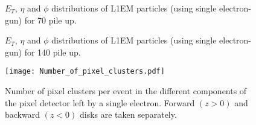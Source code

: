 \documentclass[a4paper,12pt,oneside]{article}
\begin{document}
        \begin{figure}[!htb]
          \centering
          \caption{$E_{T}$, $\eta$ and $\phi$ distributions of L1EM particles (using single electron-gun) for 70 pile up.}
          \label{}
        \end{figure}

        \begin{figure}[!htb]
          \centering
          \caption{$E_{T}$, $\eta$ and $\phi$ distributions of L1EM particles (using single electron-gun) for 140 pile up.}
          \label{}
        \end{figure}

        \begin{figure}[!htb]
          \centering
          \texttt{[image: Number\_of\_pixel\_clusters.pdf]}
          \caption{Number of pixel clusters per event in the different components of the pixel detector left by a single electron.
            Forward $(z>0)$ and backward $(z<0)$ disks are taken separately.}
          \label{}
        \end{figure}


%
\end{document}
